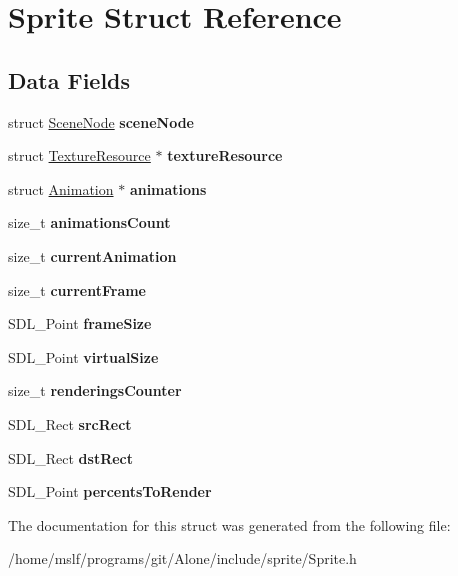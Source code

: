 \hypertarget{struct_sprite}{}\section{Sprite Struct Reference}
\label{struct_sprite}
\subsection*{Data Fields}
\begin{DoxyCompactItemize}
\item 
\hypertarget{struct_sprite_aca8025f56fb4ce20b974ec9a3292a9e4}{}\label{struct_sprite_aca8025f56fb4ce20b974ec9a3292a9e4} 
struct \hyperlink{struct_scene_node}{Scene\+Node} {\bfseries scene\+Node}
\item 
\hypertarget{struct_sprite_aedd0da0c072332f83e64105f8682bbdf}{}\label{struct_sprite_aedd0da0c072332f83e64105f8682bbdf} 
struct \hyperlink{struct_texture_resource}{Texture\+Resource} $\ast$ {\bfseries texture\+Resource}
\item 
\hypertarget{struct_sprite_a23497f8f3357b38faee4390a9250a140}{}\label{struct_sprite_a23497f8f3357b38faee4390a9250a140} 
struct \hyperlink{struct_animation}{Animation} $\ast$ {\bfseries animations}
\item 
\hypertarget{struct_sprite_abe2355bebafd752b94a82a7a3b89c4fb}{}\label{struct_sprite_abe2355bebafd752b94a82a7a3b89c4fb} 
size\+\_\+t {\bfseries animations\+Count}
\item 
\hypertarget{struct_sprite_a712df7aeb9afad06723b1d6039536010}{}\label{struct_sprite_a712df7aeb9afad06723b1d6039536010} 
size\+\_\+t {\bfseries current\+Animation}
\item 
\hypertarget{struct_sprite_a3ff28beecee781f499b33b0884780b85}{}\label{struct_sprite_a3ff28beecee781f499b33b0884780b85} 
size\+\_\+t {\bfseries current\+Frame}
\item 
\hypertarget{struct_sprite_a00e3e84ed927380c31f4dc8c78b9ece0}{}\label{struct_sprite_a00e3e84ed927380c31f4dc8c78b9ece0} 
S\+D\+L\+\_\+\+Point {\bfseries frame\+Size}
\item 
\hypertarget{struct_sprite_adb68fcb1538fd0cf266d60d269fd692a}{}\label{struct_sprite_adb68fcb1538fd0cf266d60d269fd692a} 
S\+D\+L\+\_\+\+Point {\bfseries virtual\+Size}
\item 
\hypertarget{struct_sprite_aa0f217b6015a263a7772e05119a14cb2}{}\label{struct_sprite_aa0f217b6015a263a7772e05119a14cb2} 
size\+\_\+t {\bfseries renderings\+Counter}
\item 
\hypertarget{struct_sprite_a0717c803d1a988e69bf04032a0a1adb6}{}\label{struct_sprite_a0717c803d1a988e69bf04032a0a1adb6} 
S\+D\+L\+\_\+\+Rect {\bfseries src\+Rect}
\item 
\hypertarget{struct_sprite_a80f3f86b8f750b604dd07a40509447e0}{}\label{struct_sprite_a80f3f86b8f750b604dd07a40509447e0} 
S\+D\+L\+\_\+\+Rect {\bfseries dst\+Rect}
\item 
\hypertarget{struct_sprite_aa3f156d306f0208105c9789d7a363d72}{}\label{struct_sprite_aa3f156d306f0208105c9789d7a363d72} 
S\+D\+L\+\_\+\+Point {\bfseries percents\+To\+Render}
\end{DoxyCompactItemize}


The documentation for this struct was generated from the following file\+:\begin{DoxyCompactItemize}
\item 
/home/mslf/programs/git/\+Alone/include/sprite/Sprite.\+h\end{DoxyCompactItemize}

